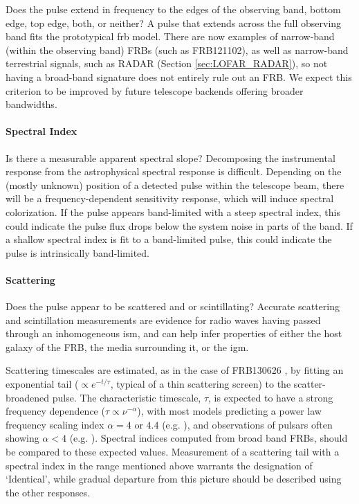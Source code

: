 \documentclass[a4paper,fleqn,usenatbib]{mnras}
\begin{document}
Does the pulse extend in frequency to the edges of the observing band, bottom
edge, top edge, both, or neither? A pulse that extends across the full observing
band fits the prototypical \gls{frb} model. There are now examples of
narrow-band (within the observing band) FRBs (such as FRB121102), as well as
narrow-band terrestrial signals, such as RADAR (Section \ref{sec:LOFAR_RADAR}),
so not having a broad-band signature does not entirely rule out an FRB.  We
expect this criterion to be improved by future telescope backends offering
broader bandwidths. 

\paragraph{Spectral Index}

Is there a measurable apparent spectral slope? Decomposing the instrumental
response from the astrophysical spectral response is difficult.  Depending on
the (mostly unknown) position of a detected pulse within the telescope beam,
there will be a frequency-dependent sensitivity response, which will induce
spectral colorization.  If the pulse appears band-limited with a steep spectral
index, this could indicate the pulse flux drops below the system noise in parts
of the band. If a shallow spectral index is fit to a band-limited pulse, this
could indicate the pulse is intrinsically band-limited.

\paragraph{Scattering}

Does the pulse appear to be scattered and or scintillating?  Accurate scattering
and scintillation measurements are evidence for radio waves having passed
through an inhomogeneous \gls{ism}, and can help infer properties of either the
host galaxy of the FRB,  the media surrounding it, or the \gls{igm}.

Scattering timescales are estimated, as in the case of FRB130626
\citep{2016MNRAS.460L..30C}, by fitting an exponential tail ($\propto
e^{-t/\tau}$, typical of a thin scattering screen) to the scatter-broadened
pulse. The characteristic timescale, $\tau$, is expected to have a strong
frequency dependence ($\tau \propto \nu^{-\alpha}$), with most models predicting
a power law frequency scaling index $\alpha =4$ or $4.4$ (e.g.
\citealt{Rickett1977}), and observations of pulsars often showing $\alpha < 4$
(e.g. \citealt{Lewandowski2015,Geyer2017}).  Spectral indices computed from
broad band FRBs, should be compared to these expected values.  Measurement of a
scattering tail with a spectral index in the range mentioned above warrants the
designation of `Identical', while gradual departure from this picture should be
described using the other responses. 
\end{document}
